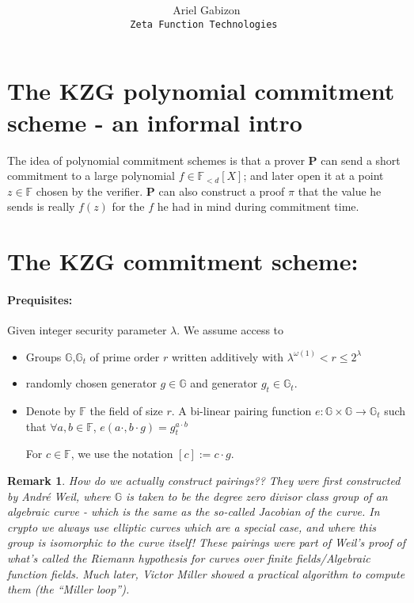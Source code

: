 \documentclass[11pt]{article} %
\title{ \bf \papertitle \\[0.72cm]}
\author{ Ariel Gabizon \\ \tt{Zeta Function Technologies}  }
\newcommand{\G}{\ensuremath{{\mathbb G}}\xspace}
\newcommand{\Gt}{\ensuremath{{\mathbb G}_t}\xspace}
\newcommand{\F}{\ensuremath{\mathbb F}\xspace}
\newcommand{\defeq}{:=}
\newcommand{\enc}[1]{\ensuremath{\left[#1\right]}\xspace}
\newcommand{\prv}{\ensuremath{\mathsf{\mathbf{P}}}\xspace}
\newcommand{\prf}{\ensuremath{\pi}\xspace}
\newcommand{\polysofdeg}[1]{\ensuremath{\F_{< #1}[X]}\xspace}
\newtheorem{remark}[lemma]{Remark}
\begin{document}
\maketitle


\section{The KZG polynomial commitment scheme - an informal intro}

The idea of polynomial commitment schemes is that a prover \prv can send a short commitment to a large polynomial $f\in \polysofdeg{d}$;
and later open it at a point $z\in \F$ chosen by the verifier.
\prv can also construct a proof \prf that the value he sends is really $f(z)$ for the $f$ he had in mind during commitment time.

\section{The KZG commitment scheme:}
\paragraph{Prequisites:}
Given integer security parameter $\lambda$. We assume access to
\begin{itemize}
 \item 
Groups \G,\Gt of prime order $r$ written additively with $\lambda^{\omega(1)}<r\leq 2^{\lambda}$
\item randomly chosen generator $g\in \G$ and generator $g_t\in \Gt$.

\item Denote by \F the field of size $r$. A bi-linear pairing function $e:\G\times \G \to \Gt$ such that $\forall a,b \in \F$, 
$e(a\cdot ,b\cdot g) = g_t^{a\cdot b}$


For $c\in \F$, we use the notation $\enc{c}\defeq c\cdot g$.

\end{itemize}

\begin{remark}
 How do we actually construct pairings??
 They were first constructed by Andr\'e Weil, where $\G$ is taken to be the degree zero divisor class group of an algebraic curve - which is the same as the so-called Jacobian of the curve. In crypto we always use elliptic curves which are a special case, and where this group is isomorphic to the curve itself!  These pairings were part of Weil's proof of what's called the Riemann hypothesis for curves over finite fields/Algebraic function fields. 
 Much later, Victor Miller showed a practical algorithm to compute them (the ``Miller loop'').
\end{remark}
\end{document}
